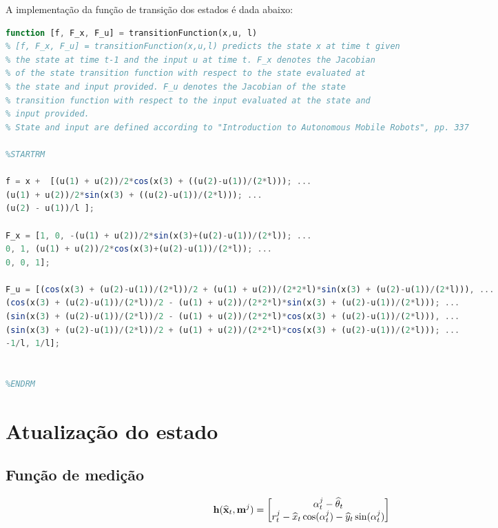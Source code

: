 \clearpage

A implementação da função de transição dos estados é dada abaixo:

\begin{lstlisting}[language=Octave]
function [f, F_x, F_u] = transitionFunction(x,u, l)
% [f, F_x, F_u] = transitionFunction(x,u,l) predicts the state x at time t given
% the state at time t-1 and the input u at time t. F_x denotes the Jacobian
% of the state transition function with respect to the state evaluated at
% the state and input provided. F_u denotes the Jacobian of the state
% transition function with respect to the input evaluated at the state and
% input provided.
% State and input are defined according to "Introduction to Autonomous Mobile Robots", pp. 337

%STARTRM

f = x +  [(u(1) + u(2))/2*cos(x(3) + ((u(2)-u(1))/(2*l))); ...
(u(1) + u(2))/2*sin(x(3) + ((u(2)-u(1))/(2*l))); ...
(u(2) - u(1))/l ];

F_x = [1, 0, -(u(1) + u(2))/2*sin(x(3)+(u(2)-u(1))/(2*l)); ...
0, 1, (u(1) + u(2))/2*cos(x(3)+(u(2)-u(1))/(2*l)); ...
0, 0, 1];

F_u = [(cos(x(3) + (u(2)-u(1))/(2*l))/2 + (u(1) + u(2))/(2*2*l)*sin(x(3) + (u(2)-u(1))/(2*l))), ...
(cos(x(3) + (u(2)-u(1))/(2*l))/2 - (u(1) + u(2))/(2*2*l)*sin(x(3) + (u(2)-u(1))/(2*l))); ...
(sin(x(3) + (u(2)-u(1))/(2*l))/2 - (u(1) + u(2))/(2*2*l)*cos(x(3) + (u(2)-u(1))/(2*l))), ...
(sin(x(3) + (u(2)-u(1))/(2*l))/2 + (u(1) + u(2))/(2*2*l)*cos(x(3) + (u(2)-u(1))/(2*l))); ...
-1/l, 1/l];    


%ENDRM

\end{lstlisting}



\clearpage

\section{Atualização do estado}

\subsection{Função de medição}

\begin{equation}\label{eq:h}
	\mathbf{h}(\widehat{\mathbf{x}}_t,\mathbf{m}^j) = \begin{bmatrix}
		\alpha_t^j - \widehat{\theta}_t \\
		r_t^j - \widehat{x}_t\cos(\alpha_t^j) - \widehat{y}_t\sin(\alpha_t^j)
	\end{bmatrix}
\end{equation}

